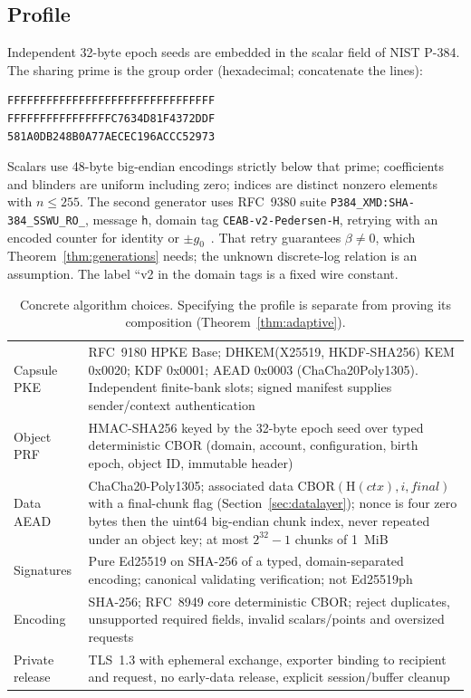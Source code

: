 \documentclass[pdflatex,sn-mathphys-num]{sn-jnl}%
\theoremstyle{plain}
\theoremstyle{definition}
\newcommand{\code}[1]{\texttt{#1}}
\begin{document}
\subsection{Profile}\label{sec:profile}
Independent 32-byte epoch seeds are embedded in the scalar field of NIST P-384. The sharing prime is the group order (hexadecimal; concatenate the lines):
\begin{Verbatim}[fontsize=\small]
FFFFFFFFFFFFFFFFFFFFFFFFFFFFFFFF
FFFFFFFFFFFFFFFFC7634D81F4372DDF
581A0DB248B0A77AECEC196ACCC52973
\end{Verbatim}
Scalars use 48-byte big-endian encodings strictly below that prime; coefficients and blinders are uniform including zero; indices are distinct nonzero elements with $n\le255$. The second generator uses RFC~9380 suite \code{P384\_XMD:SHA-384\_SSWU\_RO\_}, message \code{h}, domain tag \code{CEAB-v2-Pedersen-H}, retrying with an encoded counter for identity or $\pm g_0$~\cite{rfc9380,sec2}. That retry guarantees $\beta\ne0$, which Theorem~\ref{thm:generations} needs; the unknown discrete-log relation is an assumption. The label ``v2 in the domain tags is a fixed wire constant.

\begin{table}[htbp]
\caption{Concrete algorithm choices. Specifying the profile is separate from proving its composition (Theorem~\ref{thm:adaptive}).}\label{tab:profile}
\centering\footnotesize
\altrows
\begin{tabularx}{\linewidth}{@{}p{.27\linewidth}Y@{}}\toprule
{} & \\\midrule
Capsule PKE & RFC~9180 HPKE Base; DHKEM(X25519, HKDF-SHA256) KEM 0x0020; KDF 0x0001; AEAD 0x0003 (ChaCha20Poly1305). Independent finite-bank slots; signed manifest supplies sender/context authentication~\cite{rfc9180}\\
Object PRF & HMAC-SHA256 keyed by the 32-byte epoch seed over typed deterministic CBOR (domain, account, configuration, birth epoch, object ID, immutable header)\\
Data AEAD & ChaCha20-Poly1305; associated data CBOR$(\mathrm{H}(\mathit{ctx}),i,\mathit{final})$ with a final-chunk flag (Section~\ref{sec:datalayer}); nonce is four zero bytes then the uint64 big-endian chunk index, never repeated under an object key; at most $2^{32}-1$ chunks of 1~MiB~\cite{rfc8439}\\
Signatures & Pure Ed25519 on SHA-256 of a typed, domain-separated encoding; canonical validating verification; not Ed25519ph~\cite{rfc8032}\\
Encoding & SHA-256; RFC~8949 core deterministic CBOR; reject duplicates, unsupported required fields, invalid scalars/points and oversized requests~\cite{rfc8949}\\
Private release & TLS~1.3 with ephemeral exchange, exporter binding to recipient and request, no early-data release, explicit session/buffer cleanup~\cite{rfc8446}\\\bottomrule
\end{tabularx}
\end{table}
\end{document}
